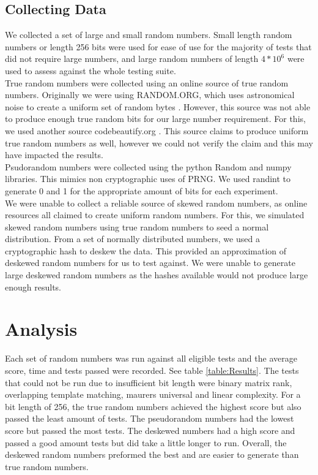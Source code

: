 \documentclass[11pt,letterpaper,conference]{IEEEtran}
\begin{document}
\subsection{Collecting Data}
We collected a set of large and small random numbers. Small length random numbers or length 256 bits were used for ease of use for the majority of tests that did not require large numbers, and large random numbers of length $4*10^6$ were used to assess against the whole testing suite.\\
True random numbers were collected using an online source of true random numbers. Originally we were using RANDOM.ORG, which uses astronomical noise to create a uniform set of random bytes \cite{RANDOM.ORG}. However, this source was not able to produce enough true random bits for our large number requirement. For this, we used another source codebeautify.org \cite{codebeautify}. This source claims to produce uniform true random numbers as well, however we could not verify the claim and this may have impacted the results.\\

Psudorandom numbers were collected using the python Random and numpy libraries. This mimics non cryptographic uses of PRNG. We used randint to generate 0 and 1 for the appropriate amount of bits for each experiment.\\

We were unable to collect a reliable source of skewed random numbers, as online resources all claimed to create uniform random numbers. For this, we simulated skewed random numbers using true random numbers to seed a normal distribution. From a set of normally distributed numbers, we used a cryptographic hash to deskew the data. This provided an approximation of deskewed random numbers for us to test against. We were unable to generate large deskewed random numbers as the hashes available would not produce large enough results.

\section{Analysis}
Each set of random numbers was run against all eligible tests and the average score, time and tests passed were recorded. See table \ref{table:Results}.
The tests that could not be run due to insufficient bit length were binary matrix rank, overlapping template matching, maurers universal and linear complexity. For a bit length of 256, the true random numbers achieved the highest score but also passed the least amount of tests. The pseudorandom numbers had the lowest score but passed the most tests. The deskewed numbers had a high score and passed a good amount tests but did take a little longer to run. Overall, the deskewed random numbers preformed the best and are easier to generate than true random numbers.
\end{document}
